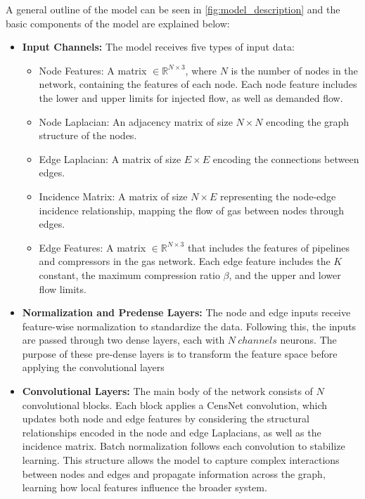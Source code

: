 A general outline of the model can be seen in \cref{fig:model_description} and the basic components of the model are explained below:

\begin{itemize}
    \item \textbf{Input Channels:} The model receives five types of input data:
        
        
    \begin{itemize}
        \item Node Features: A matrix $\in \mathbb{R}^{N \times 3}$, where $N$ is the number of nodes in the network, containing the features of each node. Each node feature includes the lower and upper limits for injected flow, as well as demanded flow.
        \item Node Laplacian: An adjacency matrix of size $N\times N$ encoding the graph structure of the nodes.
        \item Edge Laplacian: A matrix of size $E\times E$ encoding the connections between edges.
        \item Incidence Matrix: A matrix of size $N\times E$ representing the node-edge incidence relationship, mapping the flow of gas between nodes through edges.
        \item Edge Features: A matrix $\in \mathbb{R}^{N \times 3}$ that includes the features of pipelines and compressors in the gas network. Each edge feature includes the $K$ constant, the maximum compression ratio $\beta$, and the upper and lower flow limits.
    \end{itemize}

    \item \textbf{Normalization and Pre\-dense Layers:} The node and edge inputs receive feature-wise normalization to standardize the data. Following this, the inputs are passed through two dense layers, each with $N \ channels$ neurons. The purpose of these pre-dense layers is to transform the feature space before applying the convolutional layers 

    \item \textbf{Convolutional Layers:} The main body of the network consists of \(N\) convolutional blocks. Each block applies a CensNet convolution, which updates both node and edge features by considering the structural relationships encoded in the node and edge Laplacians, as well as the incidence matrix. Batch normalization follows each convolution to stabilize learning. This structure allows the model to capture complex interactions between nodes and edges and propagate information across the graph, learning how local features influence the broader system.
   

\end{itemize}
